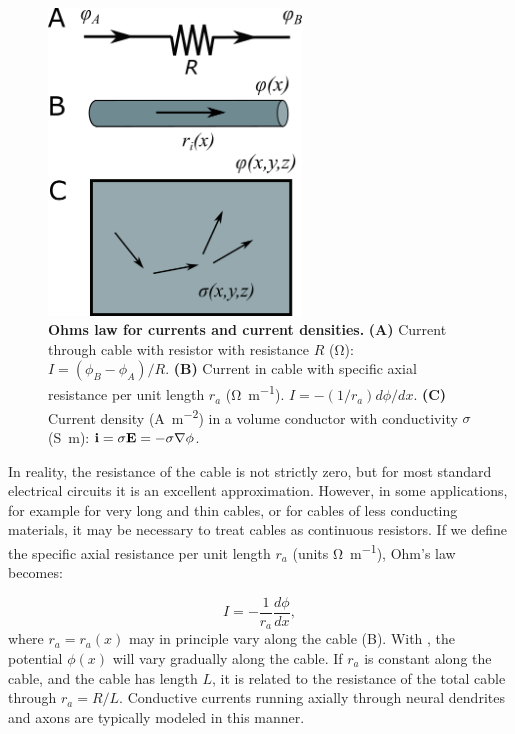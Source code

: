 \begin{figure}[!ht]
\begin{center}
\includegraphics[width=0.6\textwidth]{Figures/Basics/Currents.png}
\end{center}
\caption{{\bf Ohms law for currents and current densities.} {\bf (A)} Current through cable with resistor with resistance $R$ (\si{\ohm}): $I = (\phi_B-\phi_A)/R$. {\bf (B)} Current in cable with specific axial resistance per unit length $r_a$ (\si{\ohm\per\metre}).  $I=- (1/r_a) d\phi/dx$. {\bf (C)} Current density (\si{\ampere\per\square\metre}) in a volume conductor with conductivity $\sigma$ (\si{\siemens\metre}): ${\bf i} = \sigma {\bf E} = - \sigma {\bf \nabla} \phi$.}
\label{fig:Basics:Currents}
\end{figure}

In reality, the resistance of the cable is not strictly zero, but for most standard electrical circuits it is an excellent approximation. However, in some applications, for example for very long and thin cables, or for cables of less conducting  materials, it may be necessary to treat cables as continuous resistors. If we define the specific axial resistance per unit length $r_{a}$ (units \si{\ohm\per\metre}), Ohm's law becomes: 

\begin{equation}
I = - \frac{1}{r_a}\frac{d\phi}{dx}, 
\label{eq:Basics:Ohm_r}
\end{equation}
where $r_a=r_a(x)$ may in principle vary along the cable (B). With , the potential $\phi(x)$ will vary gradually along the cable. If $r_a$ is constant along the cable, and the cable has length $L$, it is related to the resistance of the total cable through $r_a=R/L$. Conductive currents running axially through neural dendrites and axons are typically modeled in this manner. 

